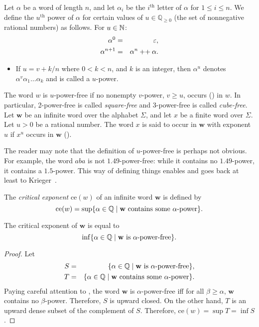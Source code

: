		\begin{definition}\label{df:power}\label{df:IEEEref}
			Let $\alpha$ be a word of length $n$, and let $\alpha_i$ be the $i^{\text{th}}$ letter of $\alpha$ for $1\le i\le n$.
			We define the $u^{\text{th}}$ power of $\alpha$ for certain values of
			$u\in\mathbb Q_{\ge 0}$ (the set of nonnegative rational numbers) as follows.
			For $u\in\mathbb{N}$:
			\begin{eqnarray*}
				\alpha^0 &=& \varepsilon,\\
				\alpha^{n+1} &=& \alpha^n \mathbin{{+}{+}} \alpha.
			\end{eqnarray*}
			\begin{itemize}
			\item If $u=v+k/n$ where $0<k<n$, and $k$ is an integer,
				then $\alpha^u$ denotes $\alpha^v \alpha_1\dots\alpha_k$ and is called a $u$-power.
			\end{itemize}
			The word $w$ is $u$-power-free if no nonempty $v$-power, $v\ge u$,
			occurs () in $w$.
			In particular, 2-power-free is called \emph{square-free}
			and 3-power-free is called \emph{cube-free}.
			Let $\mathbf{w}$ be an infinite word over the alphabet $\Sigma$, and let $x$ be a finite word over $\Sigma$.
			Let $u>0$ be a rational number.
			The word $x$ is said to occur in $\mathbf{w}$ with exponent $u$ if
			$x^{u}$ occurs in $\mathbf{w}$ ().
		\end{definition}
		The reader may note that the definition of $u$-power-free is perhaps not obvious.
		For example, the word $aba$ is not $1.49$-power-free: while it contains no $1.49$-power,
		it contains a $1.5$-power.
		This way of defining things enables  and goes back at least to Krieger~\cite[page 71]{MR2316392}.

		\begin{definition}\label{critExp}
			The \emph{critical exponent} $\mathrm{ce}(w)$ of an infinite word $\mathbf{w}$ is defined by
			\[
				\mathrm{ce}(w) = \sup \{\alpha\in\mathbb Q \mid \mathbf{w} \text{ contains some $\alpha$-power}\}.
			\]
		\end{definition}
		\begin{theorem}\label{thm:crit-exp}
			The critical exponent of $\mathbf w$ is equal to
			\[
				\inf \{\alpha\in\mathbb Q \mid \mathbf{w} \text{ is  $\alpha$-power-free}\}.
			\]
		\end{theorem}
		\begin{proof}
			Let
			\begin{eqnarray*}
				S&=&\{\alpha\in\mathbb Q \mid \mathbf{w} \text{ is  $\alpha$-power-free}\},\\
				T&=&\{\alpha\in\mathbb Q \mid \mathbf{w} \text{ contains some $\alpha$-power}\}.
			\end{eqnarray*}
			Paying careful attention to ,
			the word $\mathbf w$ is $\alpha$-power-free iff
			for all $\beta\ge\alpha$, $\mathbf w$ contains no $\beta$-power.
			Therefore, $S$ is upward closed.
			On the other hand, $T$ is an upward dense subset of the complement of $S$.
			Therefore, $\mathrm{ce}(w)=\sup T=\inf S$.
		\end{proof}

